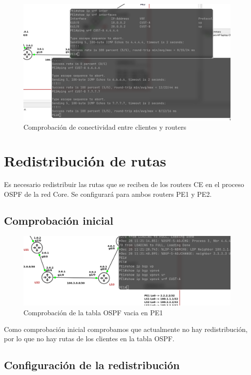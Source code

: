\documentclass{article}
\begin{document}
\begin{figure}[h]
    \centering
    \includegraphics[width=1\textwidth]{src/custpings.png}
    \caption{Comprobación de conectividad entre clientes y routers}
\end{figure}

\section{Redistribución de rutas}
Es necesario redistribuir las rutas que se reciben de los routers CE en el proceso OSPF de la red Core. Se configurará para ambos routers PE1 y PE2.

\subsection{Comprobación inicial}

\begin{figure}[h]
    \centering
    \includegraphics[width=1\textwidth]{src/ipvpn4vacia.png}
    \caption{Comprobación de la tabla OSPF vacia en PE1}
\end{figure}

Como comprobación inicial comprobamos que actualmente no hay redistribución, por lo que no hay rutas de los clientes en la tabla OSPF.

\newpage
\subsection{Configuración de la redistribución}
\end{document}
